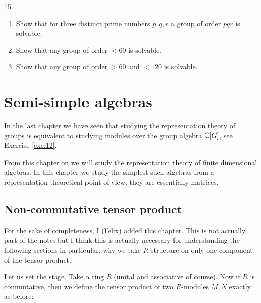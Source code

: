 \documentclass[twoside = false,	%
		headsepline,		%
		parskip = true,
		]{scrbook}						%
\begin{document}
    \begin{exercise}{}{15}
        \begin{enumerate}
            \item Show that for three distinct prime numbers $p,q,r$ a group of order $pqr$ is solvable.
            \item Show that any group of order $<60$ is solvable.
            \item Show that any group of order $>60$ and $<120$ is solvable. 
        \end{enumerate}
    \end{exercise}
    
%        
    
\chapter{Semi-simple algebras}
    In the last chapter we have seen that studying the representation theory of groups is equivalent to studying modules over the group algebra $\mathbb C[G]$, see Exercise \ref{exe:12}.

    From this chapter on we will study the representation theory of finite dimensional algebras. In this chapter we study the simplest such algebras from a representation-theoretical point of view, they are essentially matrices.
\setcounter{section}{-1}
\section{Non-commutative tensor product}\label{non-commTP}
    For the sake of completeness, I (Felix) added this chapter. This is not actually part of the notes but I think this is actually necessary for understanding the following sections in particular, why we take $R$-structure on only one component of the tensor product.

    Let us set the stage. Take a ring $R$ (unital and associative of course). Now if $R$ is commutative, then we define the tensor product of two $R$-modules $M,N$ exactly as before:
    
\end{document}
